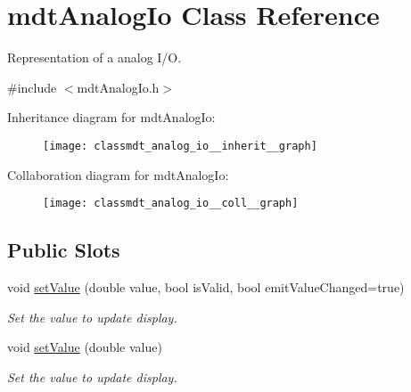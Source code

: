 \hypertarget{classmdt_analog_io}{
\section{mdtAnalogIo Class Reference}
\label{classmdt_analog_io}
}


Representation of a analog I/O.  




{\ttfamily \#include $<$mdtAnalogIo.h$>$}



Inheritance diagram for mdtAnalogIo:\nopagebreak
\begin{figure}[H]
\begin{center}
\leavevmode
\texttt{[image: classmdt\_analog\_io\_\_inherit\_\_graph]}
\end{center}
\end{figure}


Collaboration diagram for mdtAnalogIo:\nopagebreak
\begin{figure}[H]
\begin{center}
\leavevmode
\texttt{[image: classmdt\_analog\_io\_\_coll\_\_graph]}
\end{center}
\end{figure}
\subsection*{Public Slots}
\begin{DoxyCompactItemize}
\item 
void \hyperlink{classmdt_analog_io_ac83abbda2bafce5c02e3ae1dbc5e2555}{setValue} (double value, bool isValid, bool emitValueChanged=true)
\begin{DoxyCompactList}\small\item\em Set the value to update display. \end{DoxyCompactList}\item 
void \hyperlink{classmdt_analog_io_a9729875cb13fa2069e40c9abce914870}{setValue} (double value)
\begin{DoxyCompactList}\small\item\em Set the value to update display. \end{DoxyCompactList}\end{DoxyCompactItemize}
